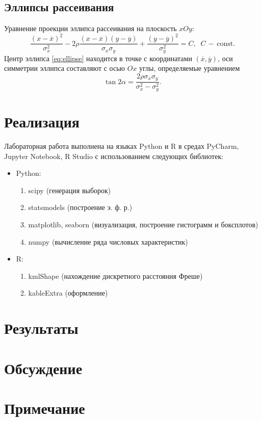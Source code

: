 \documentclass[a4paper]{article}
\begin{document}
\subsection{Эллипсы рассеивания}
Уравнение проекции эллипса рассеивания на плоскость $xOy$:
\begin{equation}\label{eq:ellipse}
    \frac{\left(x-\overline{x}\right)^2}{\sigma_x^2}-2\rho\frac{(x-\overline{x})(y-\overline{y})}{\sigma_x\sigma_y}+\frac{\left(y-\overline{y}\right)^2}{\sigma_y^2}=C,\;\;C\,-\,\text{const}.
\end{equation}
Центр эллипса \eqref{eq:ellipse} находится в точке с координатами $(\overline{x},\overline{y})$, оси симметрии эллипса составляют с осью $Ox$ углы, определяемые уравнением
\begin{equation}
    \tan{2\alpha}=\frac{2\rho\sigma_x\sigma_y}{\sigma_x^2-\sigma_y^2}.
\end{equation}
\section{Реализация}
Лабораторная работа выполнена на языках Python и R в средах PyCharm, Jupyter Notebook, R Studio с использованием следующих библиотек:
\begin{itemize}
    \item Python:
    \begin{enumerate}
        \item scipy (генерация выборок)
        \item statsmodels (построение э. ф. р.)
        \item matplotlib, seaborn (визуализация, построение гистограмм и боксплотов)
        \item numpy (вычисление ряда числовых характеристик)
    \end{enumerate}
    \item R:
    \begin{enumerate}
        \item kmlShape (нахождение дискретного расстояния Фреше)
        \item kableExtra (оформление)
\end{enumerate}
\end{itemize}
\section{Результаты}
\section{Обсуждение}
\section*{Примечание}
\end{document}
